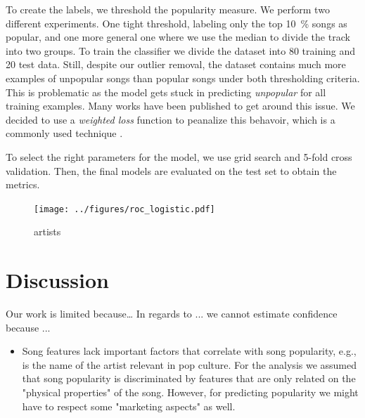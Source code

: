 \documentclass{article}
\begin{document}
To create the labels, we threshold the popularity measure. 
We perform two different experiments. 
One tight threshold, labeling only the top \SI{10}{\percent} songs as popular, and one more general one where we use the median to divide the track into two groups.
To train the classifier we divide the dataset into 80 training and 20 test data.
Still, despite our outlier removal, the dataset contains much more examples of unpopular songs than popular songs under both thresholding criteria.
This is problematic as the model gets stuck in predicting \textit{unpopular} for all training examples. 
Many works have been published to get around this issue. We decided to use a \textit{weighted loss} function to peanalize this behavoir, which is a commonly used technique \cite{haixiangLearningClassimbalancedData2017a}.

To select the right parameters for the model, we use grid search and 5-fold cross validation. Then, the final models are evaluated on the test set to obtain the metrics.

\begin{figure}
  \centering
  \texttt{[image: ../figures/roc\_logistic.pdf]}
  \caption{artists}
  \label{fig:filtering}
\end{figure}

\section{Discussion}
Our work is limited because\dots
In regards to ... we cannot estimate confidence because ...

\begin{itemize}
  \item Song features lack important factors that correlate with song popularity, e.g., is the name of the artist relevant in pop culture. For the analysis we assumed that song popularity is discriminated by features that are only related on the "physical properties" of the song. However, for predicting popularity we might have to respect some "marketing aspects" as well. 
\end{itemize}
\end{document}
